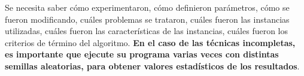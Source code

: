 Se necesita saber cómo experimentaron, cómo definieron parámetros,
cómo se fueron modificando, cuáles problemas se trataron, cuáles fueron
las instancias utilizadas, cuáles fueron las características de las
instancias, cuáles fueron los criterios de término del algoritmo.
\textbf{En el caso de las técnicas incompletas, es importante que
ejecute su programa varias veces con distintas semillas aleatorias,
para obtener valores estadísticos de los resultados}.


